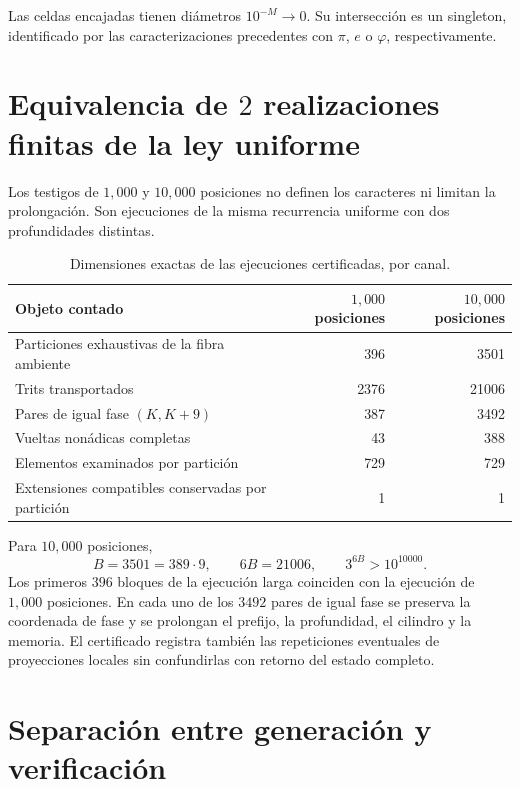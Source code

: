 \begin{corollary}
Las celdas encajadas tienen diámetros \(10^{-M}\to0\). Su intersección es
un singleton, identificado por las caracterizaciones precedentes con
\(\pi\), \(e\) o \(\varphi\), respectivamente.
\end{corollary}

\section{Equivalencia de \(2\) realizaciones finitas de la ley uniforme}

Los testigos de \(1,000\) y \(10,000\) posiciones no definen los
caracteres ni limitan la prolongación. Son ejecuciones de la misma recurrencia
uniforme con dos profundidades distintas.

\begin{table}[htbp]
\centering
\caption{Dimensiones exactas de las ejecuciones certificadas, por canal.}
\label{gfp:b:tab:dimensiones-ejecuciones-1000-10000}
\begin{tabular}{lrr}
\toprule
Objeto contado & \(1,000\) posiciones & \(10,000\) posiciones\\
\midrule
Particiones exhaustivas de la fibra ambiente & 396 & 3501\\
Trits transportados & 2376 & 21006\\
Pares de igual fase \((K,K+9)\) & 387 & 3492\\
Vueltas nonádicas completas & 43 & 388\\
Elementos examinados por partición & 729 & 729\\
Extensiones compatibles conservadas por partición & 1 & 1\\
\bottomrule
\end{tabular}
\end{table}

Para \(10,000\) posiciones,
\[
 B=3501=389\cdot9,
 \qquad
 6B=21006,
 \qquad
 3^{6B}>10^{10000}.
\]
Los primeros \(396\) bloques de la ejecución larga coinciden con la
ejecución de \(1,000\) posiciones. En cada uno de los \(3492\) pares de
igual fase se preserva la coordenada de fase y se prolongan el prefijo, la
profundidad, el cilindro y la memoria. El certificado registra también las
repeticiones eventuales de proyecciones locales sin confundirlas con retorno
del estado completo.

\section{Separación entre generación y verificación}


